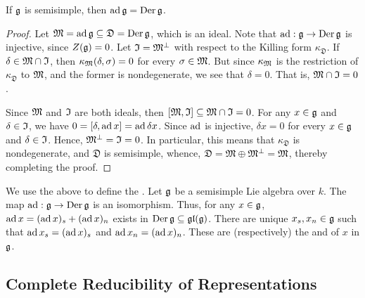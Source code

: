 \begin{theorem}
    If $\mathfrak{g}$ is semisimple, then $\operatorname{ad}\mathfrak{g} = \operatorname{Der}\mathfrak{g}$. 
\end{theorem}
\begin{proof}
    Let $\mathfrak{M} = \operatorname{ad}\mathfrak{g}\subseteq\mathfrak{D} = \operatorname{Der}\mathfrak{g}$, which is an ideal. Note that $\operatorname{ad}:\mathfrak{g}\to\operatorname{Der}\mathfrak{g}$ is injective, since $Z(\mathfrak{g}) = 0$. Let $\mathfrak{I} = \mathfrak{M}^\perp$ with respect to the Killing form $\kappa_{\mathfrak D}$. If $\delta\in\mathfrak{M}\cap\mathfrak{I}$, then $\kappa_{\mathfrak{M}}(\delta, \sigma) = 0$ for every $\sigma\in\mathfrak{M}$. But since $\kappa_{\mathfrak{M}}$ is the restriction of $\kappa_{\mathfrak{D}}$ to $\mathfrak{M}$, and the former is nondegenerate, we see that $\delta = 0$. That is, $\mathfrak{M}\cap\mathfrak{I} = 0$.

    Since $\mathfrak{M}$ and $\mathfrak{I}$ are both ideals, then $[\mathfrak{M},\mathfrak{I}]\subseteq\mathfrak{M}\cap\mathfrak{I} = 0$. For any $x\in\mathfrak{g}$ and $\delta\in\mathfrak{I}$, we have $0 = [\delta,\operatorname{ad} x] = \operatorname{ad}\delta x$. Since $\operatorname{ad}$ is injective, $\delta x = 0$ for every $x\in\mathfrak{g}$ and $\delta\in\mathfrak{I}$. Hence, $\mathfrak{M}^\perp = \mathfrak{I} = 0$. In particular, this means that $\kappa_{\mathfrak D}$ is nondegenerate, and $\mathfrak D$ is semisimple, whence, $\mathfrak D = \mathfrak{M}\oplus\mathfrak{M}^\perp = \mathfrak{M}$, thereby completing the proof.
\end{proof}

We use the above to define the . Let $\mathfrak{g}$ be a semisimple Lie algebra over $k$. The map $\operatorname{ad}:\mathfrak{g}\to\operatorname{Der}\mathfrak{g}$ is an isomorphism. Thus, for any $x\in\mathfrak{g}$, $\operatorname{ad} x = (\operatorname{ad} x)_s + (\operatorname{ad} x)_n$ exists in $\operatorname{Der}\mathfrak{g}\subseteq\mathfrak{gl}(\mathfrak{g})$. There are unique $x_s,  x_n\in\mathfrak{g}$ such that $\operatorname{ad} x_s = (\operatorname{ad} x)_s$ and $\operatorname{ad} x_n = (\operatorname{ad} x)_n$. These are (respectively) the  and  of $x$ in $\mathfrak{g}$.

\subsection{Complete Reducibility of Representations}

